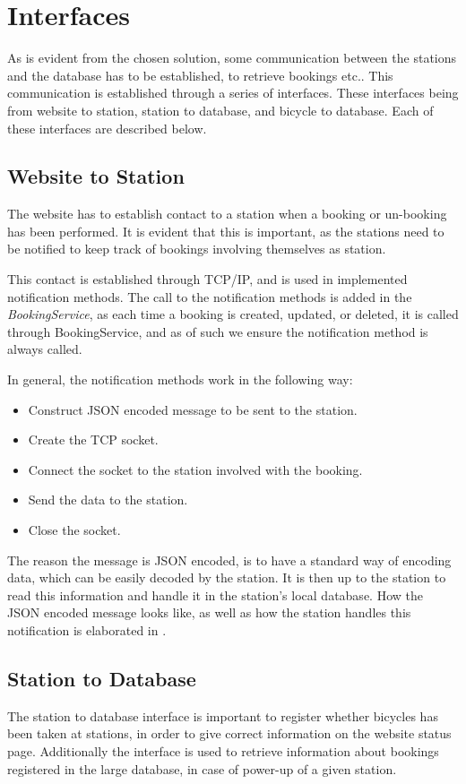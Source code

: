 \section{Interfaces}\label{sec:interfaces}
As is evident from the chosen solution, some communication between the stations and the database has to be established, to retrieve bookings etc..
This communication is established through a series of interfaces.
These interfaces being from website to station, station to database, and bicycle to database.
Each of these interfaces are described below.

\subsection{Website to Station}\label{sec:webToStationI}
The website has to establish contact to a station when a booking or un-booking has been performed.
It is evident that this is important, as the stations need to be notified to keep track of bookings involving themselves as station.

This contact is established through TCP/IP, and is used in implemented notification methods.
The call to the notification methods is added in the \textit{BookingService}, as each time a booking is created, updated, or deleted, it is called through BookingService, and as of such we ensure the notification method is always called.

In general, the notification methods work in the following way:
\begin{itemize}
	\item Construct JSON encoded message to be sent to the station.
	\item Create the TCP socket.
	\item Connect the socket to the station involved with the booking.
	\item Send the data to the station.
	\item Close the socket.
\end{itemize}

The reason the message is JSON encoded, is to have a standard way of encoding data, which can be easily decoded by the station.
It is then up to the station to read this information and handle it in the station's local database.
How the JSON encoded message looks like, as well as how the station handles this notification is elaborated in .

\subsection{Station to Database}
The station to database interface is important to register whether bicycles has been taken at stations, in order to give correct information on the website status page.
Additionally the interface is used to retrieve information about bookings registered in the large database, in case of power-up of a given station.

